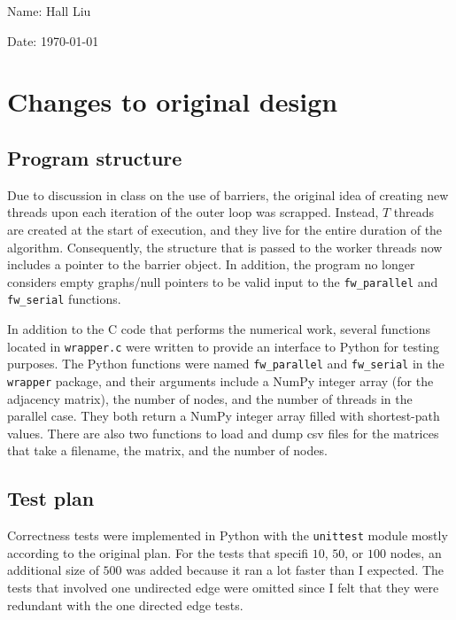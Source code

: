 \documentclass{article}
\begin{document}
Name: Hall Liu

Date: \today 
\vspace{20pt}

\section*{Changes to original design}
\subsection*{Program structure}
Due to discussion in class on the use of barriers, the original idea of creating new threads upon each iteration of the outer loop was scrapped. Instead, $T$ threads are created at the start of execution, and they live for the entire duration of the algorithm. Consequently, the structure that is passed to the worker threads now includes a pointer to the barrier object. In addition, the program no longer considers empty graphs/null pointers to be valid input to the \verb|fw_parallel| and \verb|fw_serial| functions.

In addition to the C code that performs the numerical work, several functions located in \verb|wrapper.c| were written to provide an interface to Python for testing purposes. The Python functions were named \verb|fw_parallel| and \verb|fw_serial| in the \verb|wrapper| package, and their arguments include a NumPy integer array (for the adjacency matrix), the number of nodes, and the number of threads in the parallel case. They both return a NumPy integer array filled with shortest-path values. There are also two functions to load and dump csv files for the matrices that take a filename, the matrix, and the number of nodes.
\subsection*{Test plan}
Correctness tests were implemented in Python with the \verb|unittest| module mostly according to the original plan. For the tests that specifi $10$, $50$, or $100$ nodes, an additional size of $500$ was added because it ran a lot faster than I expected. The tests that involved one undirected edge were omitted since I felt that they were redundant with the one directed edge tests. 
\end{document}
